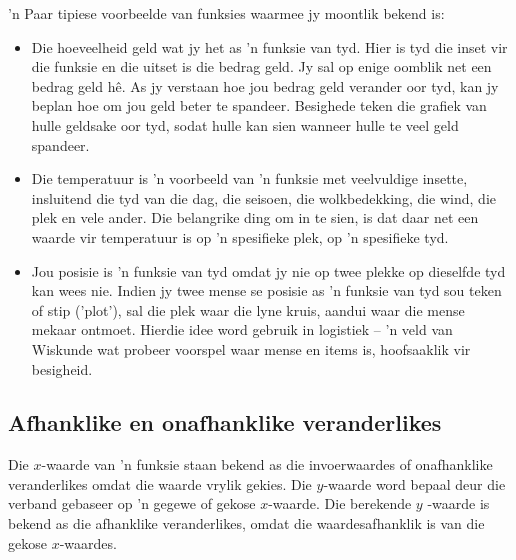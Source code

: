 ’n Paar tipiese voorbeelde van funksies waarmee jy moontlik bekend is:\par 
\begin{itemize}[noitemsep]
\item Die hoeveelheid geld wat jy het as ’n funksie van tyd. Hier is tyd die inset vir die funksie en die uitset is die bedrag geld. Jy sal op enige oomblik net een bedrag geld hê. As jy verstaan hoe jou bedrag geld verander oor tyd, kan jy beplan hoe om jou geld beter te spandeer. Besighede teken die grafiek van hulle geldsake oor tyd, sodat hulle kan sien wanneer hulle te veel geld spandeer. %

\item Die temperatuur is ’n voorbeeld van ’n funksie met veelvuldige insette, insluitend die tyd van die dag, die seisoen, die
wolkbedekking, die wind, die plek en vele ander. Die belangrike ding om in te sien, is dat daar net een waarde vir temperatuur is op ’n spesifieke plek, op ’n spesifieke tyd. %

\item Jou posisie is ’n funksie van tyd omdat jy nie op twee plekke op dieselfde tyd kan wees nie. Indien jy twee mense se posisie as ’n funksie van tyd sou teken of stip (’plot’), sal die plek waar die lyne kruis, aandui waar die mense mekaar ontmoet. Hierdie idee word gebruik in logistiek – ’n veld van Wiskunde wat probeer voorspel waar mense en items is, hoofsaaklik vir besigheid.
\end{itemize}



\subsection*{Afhanklike en onafhanklike veranderlikes}
Die $x$-waarde van 'n funksie staan bekend as die invoerwaardes of onafhanklike veranderlikes omdat die waarde vrylik gekies. Die $y$-waarde word bepaal deur die verband gebaseer op ’n gegewe of gekose $x$-waarde. Die berekende $y$ -waarde is bekend as die afhanklike veranderlikes, omdat die waardesafhanklik is van die gekose $x$-waardes.\par 


